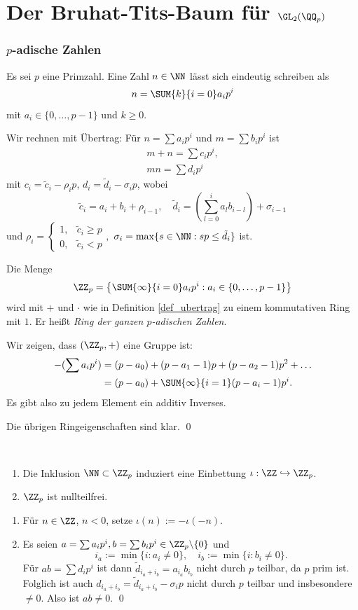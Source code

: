 \part{Der Bruhat-Tits-Baum für $\GL_2(\QQ_p)$}

\section{$p$-adische Zahlen}\label{sec_padisch}

Es sei $p$ eine Primzahl. Eine Zahl $n\in\NN$ lässt sich eindeutig
schreiben als
\[
n = \SUM{k}{i=0} a_i p^i
\]
mit $a_i\in\{0,\ldots,p-1\}$ und $k\geq 0$.

\BEM\label{def_ubertrag}
Wir rechnen mit Übertrag: Für $n=\sum a_i p^i$ und
$m=\sum b_i p^i$ ist
\begin{gather*}
m+n = \sum c_i p^i, \\
mn = \sum d_i p^i
\end{gather*}
mit
$c_i = \tilde{c}_i - \rho_i p$,
$d_i = \tilde{d}_i - \sigma_i p$,
wobei 
\[
\tilde{c}_i=a_i+b_i+\rho_{i-1},\quad
\tilde{d}_i=(\sum_{l=0}^i a_l b_{i-l})+\sigma_{i-1}
\]
und
$\rho_i = \left\{\begin{matrix}
1, & \tilde{c}_i \geq p \\
0, & \tilde{c}_i < p
\end{matrix}\right.,$
$\sigma_i=\max\{s\in\NN:sp\leq \tilde{d}_i\}$
ist.

\DB Die Menge
\[
\ZZ_p = \left\{
\SUM{\infty}{i=0} a_i p^i : a_i \in \{0,\ldots,p-1\}
\right\}
\]
wird mit $+$ und $\cdot$ wie in Definition \ref{def_ubertrag}
zu einem kommutativen Ring mit $1$. Er heißt
\emph{Ring der ganzen $p$-adischen Zahlen}.

\bew Wir zeigen, dass $(\ZZ_p,+)$ eine Gruppe ist:
\begin{align*}
-(\sum a_i p^i) &= (p-a_0) + (p-a_1-1) p + (p-a_2-1) p^2 + \ldots \\
&= (p-a_0) + \SUM{\infty}{i=1} (p-a_i-1) p^i.
\end{align*}
Es gibt also zu jedem Element ein additiv Inverses.

Die übrigen Ringeigenschaften sind klar.
\qed

\PROP\ \begin{enumerate}
\item Die Inklusion $\NN\subset \ZZ_p$ induziert eine Einbettung
$\iota:\ZZ\hookrightarrow \ZZ_p$.
\item $\ZZ_p$ ist nullteilfrei.
\end{enumerate}
\bew \begin{enumerate}
\item Für $n\in\ZZ$, $n<0$, setze $\iota(n):=-\iota(-n)$.
\item Es seien $a=\sum a_i p^i, b=\sum b_i p^i \in \ZZ_p\backslash\{0\}$ und
\[
i_a := \min\{i:a_i \neq 0\},\quad
i_b := \min\{i:b_i \neq 0\}.
\]
Für $ab=\sum d_i p^i$ ist dann $\tilde{d}_{i_a+i_b}=a_{i_a}b_{i_b}$
nicht durch $p$ teilbar, da $p$ prim ist.
Folglich ist auch $d_{i_a+i_b}=\tilde{d}_{i_a+i_b}-\sigma_i p$
nicht durch $p$ teilbar und insbesondere $\neq 0$.
Also ist $ab\neq 0$.
\qed
\end{enumerate}

